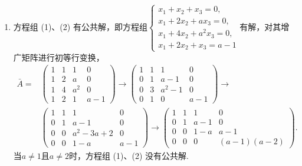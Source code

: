 \begin{enumerate}
    \item 方程组 (1)、(2) 有公共解，即方程组$\begin{cases}
                  x_1+x_2+x_3=0,     \\
                  x_1+2x_2+ax_3=0,   \\
                  x_1+4x_2+a^2x_3=0, \\
                  x_1+2x_2+x_3=a-1
              \end{cases}$有解，对其增广矩阵进行初等行变换，
          \begin{align*}
              \bar{A}= & \begin{pmatrix}
                             1 & 1 & 1   & 0   \\
                             1 & 2 & a   & 0   \\
                             1 & 4 & a^2 & 0   \\
                             1 & 2 & 1   & a-1
                         \end{pmatrix}\rightarrow
              \begin{pmatrix}
                  1 & 1 & 1     & 0   \\
                  0 & 1 & a-1   & 0   \\
                  0 & 3 & a^2-1 & 0   \\
                  0 & 1 & 0     & a-1
              \end{pmatrix}\rightarrow            \\
                       & \begin{pmatrix}
                             1 & 1 & 1        & 0   \\
                             0 & 1 & a-1      & 0   \\
                             0 & 0 & a^2-3a+2 & 0   \\
                             0 & 0 & 1-a      & a-1
                         \end{pmatrix}\rightarrow
              \begin{pmatrix}
                  1 & 1 & 1   & 0          \\
                  0 & 1 & a-1 & 0          \\
                  0 & 0 & 1-a & a-1        \\
                  0 & 0 & 0   & (a-1)(a-2)
              \end{pmatrix}.
          \end{align*}
          当$a\neq 1$且$a\neq 2$时，方程组 (1)、(2) 没有公共解.


\end{enumerate}

